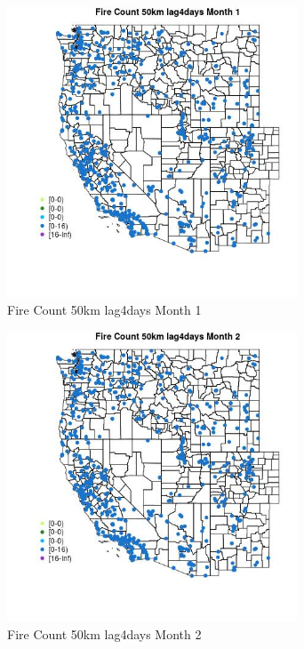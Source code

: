 \begin{figure} 
\centering  
\includegraphics[width=0.77\textwidth]{Code_Outputs/Report_ML_input_PM25_Step4_part_e_de_duplicated_aves_compiled_2019-05-21wNAs_MapObsMo1Fire_Count_50km_lag4days.jpg} 
\caption{\label{fig:Report_ML_input_PM25_Step4_part_e_de_duplicated_aves_compiled_2019-05-21wNAsMapObsMo1Fire_Count_50km_lag4days}Fire Count 50km lag4days Month 1} 
\end{figure} 
 

\begin{figure} 
\centering  
\includegraphics[width=0.77\textwidth]{Code_Outputs/Report_ML_input_PM25_Step4_part_e_de_duplicated_aves_compiled_2019-05-21wNAs_MapObsMo2Fire_Count_50km_lag4days.jpg} 
\caption{\label{fig:Report_ML_input_PM25_Step4_part_e_de_duplicated_aves_compiled_2019-05-21wNAsMapObsMo2Fire_Count_50km_lag4days}Fire Count 50km lag4days Month 2} 
\end{figure} 
 

